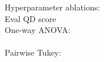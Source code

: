 \documentclass{article}
\begin{document}
    Hyperparameter ablations:\\

    Eval QD score\\
    One-way ANOVA:\\
    \\
    Pairwise Tukey:\\
    
\end{document}
